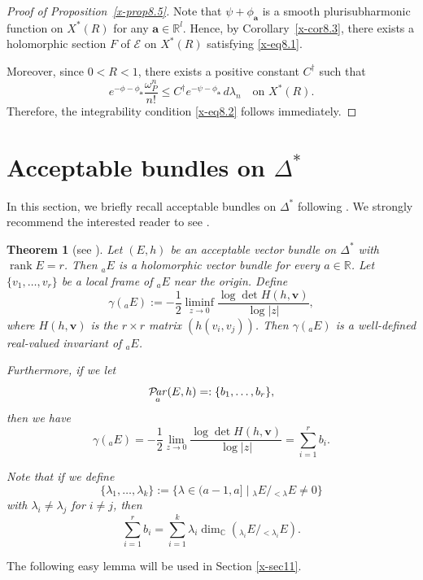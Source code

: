 \documentclass[12pt,twoside]{amsart}
\DeclareMathOperator{\rank}{rank}
\DeclareMathOperator{\Par}{\mathcal{P}\!\it{ar}}
\newtheorem{thm}{Theorem}[section]
\theoremstyle{definition}
\begin{document}
\begin{proof}[Proof of Proposition~\ref{x-prop8.5}]
Note that $\psi + \phi_{\bm a}$ is a smooth 
plurisubharmonic function on $X^*(R)$
for any $\bm a \in \mathbb R^l$.
Hence, by Corollary~\ref{x-cor8.3}, there exists a holomorphic section
$F$ of $\mathcal E$ on $X^*(R)$ satisfying \eqref{x-eq8.1}.

Moreover, since $0 < R < 1$, there exists a positive constant $C^\dagger$
such that
\[
e^{-\phi-\phi_{\bm a}} \frac{\omega^n_P}{n!}
\le C^\dagger e^{-\psi-\phi_{\bm a}} \, d\lambda_n
\quad \text{on } X^*(R).
\]
Therefore, the integrability condition \eqref{x-eq8.2} follows immediately.
\end{proof}

\section{Acceptable bundles on $\Delta^*$}\label{x-sec9} 

In this section, we briefly recall acceptable bundles on $\Delta^*$ following 
\cite{fujino-fujisawa-ono}. 
We strongly recommend the interested reader to see \cite{fujino-fujisawa-ono}. 

\begin{thm}[{see \cite[Theorem 1.9]{fujino-fujisawa-ono}}]\label{x-thm9.1}
Let $(E, h)$ be an acceptable vector 
bundle on $\Delta^*$ with $\rank E 
= r$. 
Then ${}_a E$ is a holomorphic vector bundle for every $a\in 
\mathbb R$. 
Let $\{v_1, \ldots, v_r\}$ be a local frame of ${}_a E$ near the origin. Define
\[
\gamma({}_a E) := -\frac{1}{2} \liminf_{z \to 0} \frac{\log \det H(h, \bm v)}{\log |z|},
\]
where $H(h, \bm v)$ is the $r \times r$ matrix 
$\left( h(v_i, v_j) \right)$. Then 
$\gamma({}_a E)$ is a well-defined real-valued invariant of ${}_a E$.

Furthermore, if we let
\[
\Par_a(E, h) =: \{b_1, \ldots, b_r\},
\]
then we have
\[
\gamma({}_a E) = -\frac{1}{2} 
\lim_{z \to 0} \frac{\log \det H(h, \bm v)}{\log |z|} = \sum_{i=1}^r b_i.
\] 

Note that if we define 
\[
\{\lambda_1, \ldots, \lambda_k\} 
:= \{ \lambda \in (a-1, a] \mid {}_\lambda E / {}_{<\lambda} E \ne 0 \}
\]
with $\lambda_i \ne \lambda_j$ for $i \ne j$, then
\[
\sum_{i=1}^r b_i = \sum_{i=1}^k \lambda_i 
\dim_{\mathbb{C}} \left( {}_{\lambda_i} E / {}_{<\lambda_i} E \right).
\]
\end{thm}

The following easy lemma will be used in Section \ref{x-sec11}. 
\end{document}
